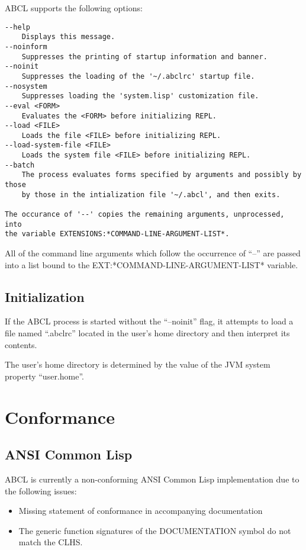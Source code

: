 \documentclass[10pt]{book}
\begin{document}
ABCL supports the following options:

\begin{verbatim}
--help
    Displays this message.
--noinform
    Suppresses the printing of startup information and banner.
--noinit
    Suppresses the loading of the '~/.abclrc' startup file.
--nosystem
    Suppresses loading the 'system.lisp' customization file. 
--eval <FORM>
    Evaluates the <FORM> before initializing REPL.
--load <FILE>
    Loads the file <FILE> before initializing REPL.
--load-system-file <FILE>
    Loads the system file <FILE> before initializing REPL.
--batch
    The process evaluates forms specified by arguments and possibly by those
    by those in the intialization file '~/.abcl', and then exits.

The occurance of '--' copies the remaining arguments, unprocessed, into
the variable EXTENSIONS:*COMMAND-LINE-ARGUMENT-LIST*.
\end{verbatim}

All of the command line arguments which follow the occurrence of ``--''
are passed into a list bound to the EXT:*COMMAND-LINE-ARGUMENT-LIST*
variable.

\section{Initialization}

If the ABCL process is started without the ``--noinit'' flag, it
attempts to load a file named ``.abclrc'' located in the user's home
directory and then interpret its contents.  

The user's home directory is determined by the value of the JVM system
property ``user.home''.

\chapter{Conformance}

\section{ANSI Common Lisp}
ABCL is currently a non-conforming ANSI Common Lisp implementation due
to the following issues:

\begin{itemize}
  \item Missing statement of conformance in accompanying documentation
  \item The generic function signatures of the DOCUMENTATION symbol do
    not match the CLHS.
\end{itemize}
\end{document}
